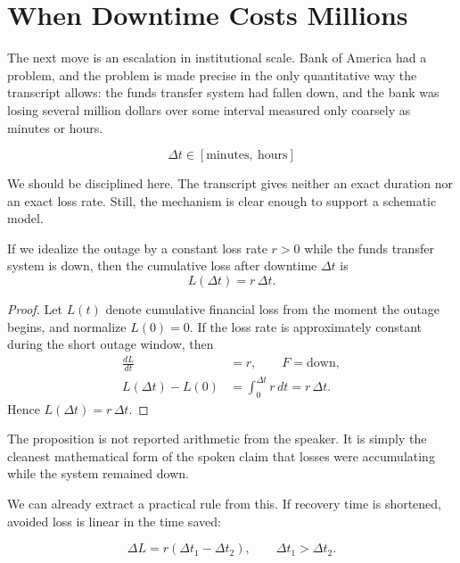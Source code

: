 \section{When Downtime Costs Millions}

The next move is an escalation in institutional scale. Bank of America had a problem, and the problem is made precise in the only quantitative way the transcript allows: the funds transfer system had fallen down, and the bank was losing several million dollars over some interval measured only coarsely as minutes or hours.

\begin{equation}
\Delta t \in [\text{minutes},\ \text{hours}]
\end{equation}

We should be disciplined here. The transcript gives neither an exact duration nor an exact loss rate. Still, the mechanism is clear enough to support a schematic model.

\begin{proposition}
If we idealize the outage by a constant loss rate \(r>0\) while the funds transfer system is down, then the cumulative loss after downtime \(\Delta t\) is
\begin{equation}
L(\Delta t)=r\,\Delta t.
\end{equation}
\end{proposition}

\begin{proof}
Let \(L(t)\) denote cumulative financial loss from the moment the outage begins, and normalize \(L(0)=0\). If the loss rate is approximately constant during the short outage window, then
\begin{align}
\frac{dL}{dt} &= r, \qquad F=\text{down},\\
L(\Delta t)-L(0) &= \int_{0}^{\Delta t} r\,dt = r\,\Delta t.
\end{align}
Hence \(L(\Delta t)=r\,\Delta t\).
\end{proof}

The proposition is not reported arithmetic from the speaker. It is simply the cleanest mathematical form of the spoken claim that losses were accumulating while the system remained down.

We can already extract a practical rule from this. If recovery time is shortened, avoided loss is linear in the time saved:

\begin{equation}
\Delta L = r(\Delta t_{1}-\Delta t_{2}),
\qquad \Delta t_{1}>\Delta t_{2}.
\end{equation}

